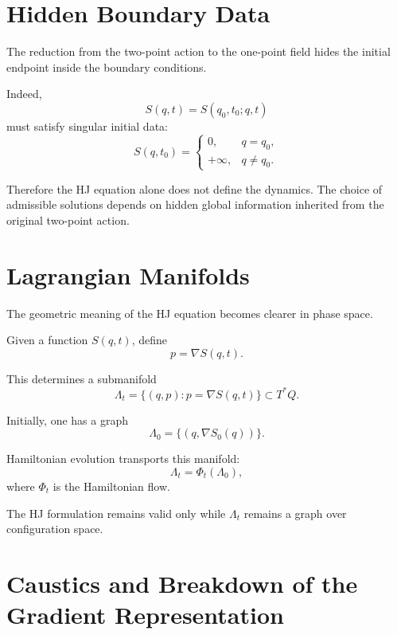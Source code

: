 \documentclass[11pt]{article}
\begin{document}
\section{Hidden Boundary Data}

The reduction from the two-point action to the one-point field hides the initial endpoint inside the boundary conditions.

Indeed,
\[
S(q,t)=S(q_0,t_0;q,t)
\]
must satisfy singular initial data:
\begin{equation}
S(q,t_0)=
\begin{cases}
0, & q=q_0,\\
+\infty, & q\neq q_0.
\end{cases}
\end{equation}

Therefore the HJ equation alone does not define the dynamics. The choice of admissible solutions depends on hidden global information inherited from the original two-point action.

\section{Lagrangian Manifolds}

The geometric meaning of the HJ equation becomes clearer in phase space.

Given a function $S(q,t)$, define
\begin{equation}
p=\nabla S(q,t).
\end{equation}

This determines a submanifold
\begin{equation}
\Lambda_t
=
\{(q,p):p=\nabla S(q,t)\}
\subset T^*Q.
\end{equation}

Initially, one has a graph
\begin{equation}
\Lambda_0=\{(q,\nabla S_0(q))\}.
\end{equation}

Hamiltonian evolution transports this manifold:
\begin{equation}
\Lambda_t=\Phi_t(\Lambda_0),
\end{equation}
where $\Phi_t$ is the Hamiltonian flow.

The HJ formulation remains valid only while $\Lambda_t$ remains a graph over configuration space.

\section{Caustics and Breakdown of the Gradient Representation}
\end{document}
